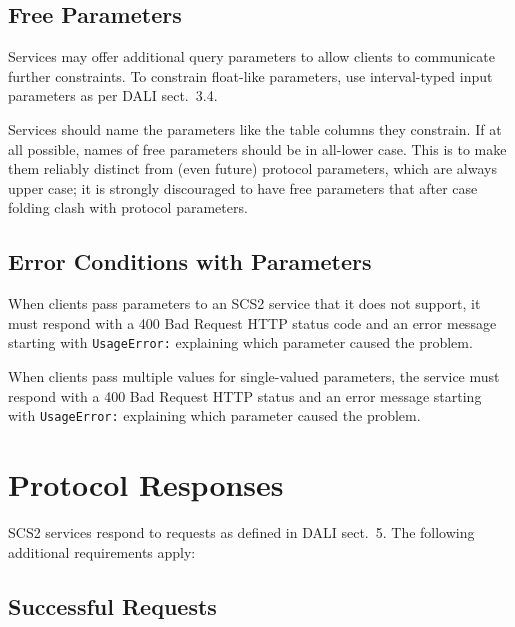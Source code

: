 \documentclass[11pt,a4paper]{ivoa}
\begin{document}
\subsection{Free Parameters}

Services may offer additional query parameters to allow clients to
communicate further constraints.  To constrain float-like parameters,
use interval-typed input parameters as per DALI sect.~3.4.

Services should name the parameters like the table columns they
constrain.  If at all possible, names of free parameters should be in
all-lower case.  This is to make them
reliably distinct from (even future) protocol
parameters, which are always upper case; it is strongly discouraged
to have free parameters that after case folding clash with protocol
parameters.

\subsection{Error Conditions with Parameters}

When clients pass parameters to an SCS2 service that it does not support,
it must respond with a 400 Bad Request HTTP status code and an error
message starting with \verb|UsageError:|
explaining which parameter caused the problem.

When clients pass multiple values for single-valued parameters, the
service must respond with a 400 Bad Request HTTP status and an error
message starting with \verb|UsageError:|
explaining which parameter caused the problem.


\section{Protocol Responses}

SCS2 services respond to requests as defined in DALI sect.~5.  The
following additional requirements apply:

\subsection{Successful Requests}
\end{document}
